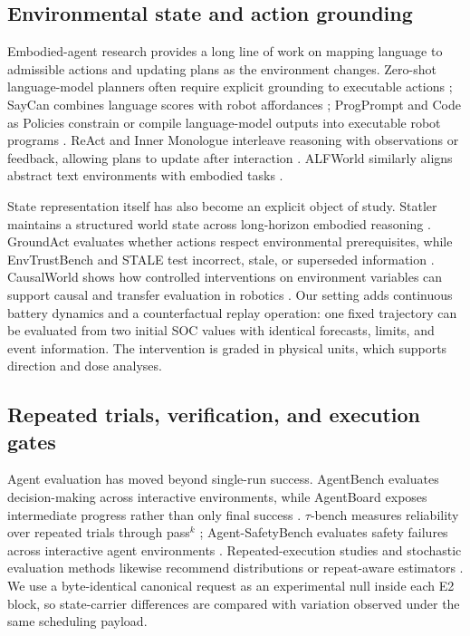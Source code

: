 \documentclass[11pt]{article}
\begin{document}
\subsection{Environmental state and action grounding}

Embodied-agent research provides a long line of work on mapping language to admissible actions and
updating plans as the environment changes. Zero-shot language-model planners often require explicit
grounding to executable actions \cite{huang2022zeroshot}; SayCan combines language scores with
robot affordances \cite{ahn2022saycan}; ProgPrompt and Code as Policies constrain or compile
language-model outputs into executable robot programs \cite{singh2023progprompt,
liang2023codepolicies}. ReAct and Inner Monologue interleave reasoning with observations or
feedback, allowing plans to update after interaction \cite{yao2023react,huang2023innermonologue}.
ALFWorld similarly aligns abstract text environments with embodied tasks
\cite{shridhar2021alfworld}.

State representation itself has also become an explicit object of study. Statler maintains a
structured world state across long-horizon embodied reasoning \cite{yoneda2024statler}. GroundAct
evaluates whether actions respect environmental prerequisites, while EnvTrustBench and STALE test
incorrect, stale, or superseded information \cite{wang2025groundact,sheng2026envtrust,
chao2026stale}. CausalWorld shows how controlled interventions on environment variables can support
causal and transfer evaluation in robotics \cite{ahmed2021causalworld}. Our setting adds continuous
battery dynamics and a counterfactual replay operation: one fixed trajectory can be evaluated from
two initial SOC values with identical forecasts, limits, and event information. The intervention
is graded in physical units, which supports direction and dose analyses.

\subsection{Repeated trials, verification, and execution gates}

Agent evaluation has moved beyond single-run success. AgentBench evaluates decision-making across
interactive environments, while AgentBoard exposes intermediate progress rather than only final
success \cite{liu2024agentbench,ma2024agentboard}. $\tau$-bench measures reliability over repeated
trials through pass$^k$ \cite{yao2024taubench}; Agent-SafetyBench evaluates safety failures across
interactive agent environments \cite{zhang2024agentsafety}. Repeated-execution studies and
stochastic evaluation methods likewise recommend distributions or repeat-aware estimators
\cite{cui2026sameprompt,lior2025reliableeval,liang2023helm}. We use a byte-identical canonical
request as an experimental null inside each E2 block, so state-carrier differences are compared
with variation observed under the same scheduling payload.
\end{document}
